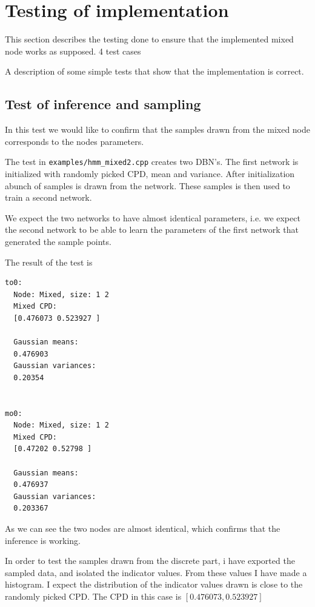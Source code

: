 \documentclass[10pt, journal, compsoc, a4paper]{IEEEtran}
\begin{document}



\section{Testing of implementation} %
\label{sec:testing_of_implementation}

This section describes the testing done to ensure that the implemented mixed node works as supposed. 4 test cases 

A description of some simple tests that show that the implementation is correct. 

\subsection{Test of inference and sampling} %
\label{sub:test_of_sampling}
In this test we would like to confirm that the samples drawn from the mixed node corresponds to the nodes parameters.

The test in \texttt{examples/hmm\_mixed2.cpp} creates two DBN's. The first network is initialized with randomly picked CPD, mean and variance. After initialization abunch of samples is drawn from the network. These samples is then used to train a second network. 

We expect the two networks to have almost identical parameters, i.e. we expect the second network to be able to learn the parameters of the first network that generated the sample points.

The result of the test is

\begin{verbatim}
to0:
  Node: Mixed, size: 1 2 
  Mixed CPD: 
  [0.476073 0.523927 ]

  Gaussian means: 
  0.476903 
  Gaussian variances: 
  0.20354 
  
  
mo0:
  Node: Mixed, size: 1 2 
  Mixed CPD: 
  [0.47202 0.52798 ]

  Gaussian means: 
  0.476937 
  Gaussian variances: 
  0.203367 
\end{verbatim}
As we can see the two nodes are almost identical, which confirms that the inference is working.

In order to test the samples drawn from the discrete part, i have exported the sampled data, and isolated the indicator values. From these values I have made a histogram. I expect the distribution of the indicator values drawn is close to the randomly picked CPD. The CPD in this case is $[0.476073, 0.523927]$
\end{document}
